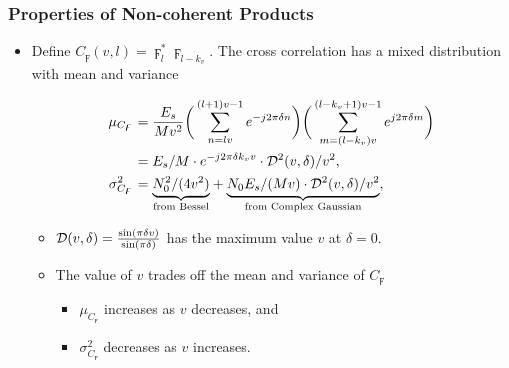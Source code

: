\begin{frame}
  \frametitle{Properties of Non-coherent Products}

    \begin{itemize}
    
      \item Define $C_{\digamma}(v,l)=\digamma_l^*\digamma_{l-k_v}$. The cross correlation has a mixed distribution with mean and variance

      \begin{equation*}
        \begin{aligned}
        \label{eq:mean_var_product_coherent_int}
        \mu_{C_{\digamma}}&=\frac{E_s}{Mv^2}\bigg(\sum_{n=lv}^{(l+1)v-1}e^{-j2\pi \delta n}\bigg)\bigg(\sum_{m=(l-k_v)v}^{(l-k_v+1)v-1}e^{j2\pi \delta m}\bigg) \\
        &=E_s/M\cdot e^{-j2\pi \delta k_vv}\cdot\mathcal{D}^2(v,\delta)/v^2, \\
        \sigma^2_{C_{\digamma}}&={\underbrace{N_0^2/(4v^2)}_{\text{from Bessel}}}+{\underbrace{N_0E_s/(Mv)\cdot\mathcal{D}^2(v,\delta)/v^2}_{\text{from Complex Gaussian}}},
        \end{aligned}
      \end{equation*}

      \begin{itemize}
        \item $\mathcal{D}(v,\delta)=\frac{\sin(\pi \delta v)}{\sin(\pi\delta)}$ 
        has the maximum value $v$ at $\delta=0$.
        \item The value of $v$ trades off the mean and variance of $C_{\digamma}$ 
        \begin{itemize}
          \item $\mu_{C_{\digamma}}$ increases as $v$ decreases, and
          \item $ \sigma^2_{C_{\digamma}}$
            decreases as $v$ increases.
        \end{itemize}
      \end{itemize}
    

    \end{itemize}



\end{frame}


